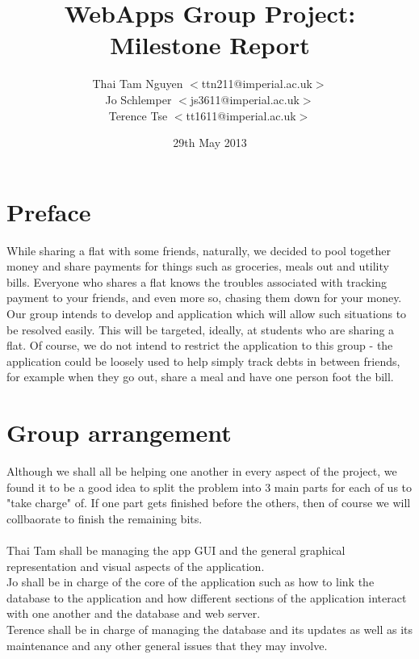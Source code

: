 \documentclass[a4paper,9t]{article}
\begin{document}
\title{WebApps Group Project: Milestone Report} \date{29th May
  2013} \author{
  Thai Tam Nguyen $<$ttn211@imperial.ac.uk$>$\\
  Jo Schlemper $<$js3611@imperial.ac.uk$>$\\
  Terence Tse  $<$tt1611@imperial.ac.uk$>$ }
\maketitle
\newpage
\section*{Preface}
While sharing a flat with some friends, naturally, we decided to pool together money and share payments for things such as groceries, meals out and utility bills. Everyone who shares a flat knows the troubles associated with tracking payment to your friends, and even more so, chasing them down for your money. Our group intends to develop and application which will allow such situations to be resolved easily. This will be targeted, ideally, at students who are sharing a flat. Of course, we do not intend to restrict the application to this group - the application could be loosely used to help simply track debts in between friends, for example when they go out, share a meal and have one person foot the bill.\\

\section*{Group arrangement}
Although we shall all be helping one another in every aspect of the project, we found it to be a good idea to split the problem into 3 main parts for each of us to "take charge" of. If one part gets finished before the others, then of course we will collbaorate to finish the remaining bits.\\ \\
Thai Tam shall be managing the app GUI and the general graphical representation and visual aspects of the application.\\
Jo shall be in charge of the core of the application such as how to link the database to the application and how different sections of the application interact with one another and the database and web server.\\
Terence shall be in charge of managing the database and its updates as well as its maintenance and any other general issues that they may involve.
\end{document}
